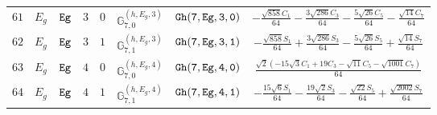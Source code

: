 \documentclass[fleqn,8pt]{jsarticle}
\begin{document}
\begin{table}[ht!]
\begin{center}
\begin{tabular}{cccccccc}
$ 61 $ & $ E_{g} $ & $ {\tt Eg} $ & $ 3 $ & $ 0 $ & $ \mathbb{G}_{7,0}^{(h,E_{g},3)} $ & $ {\tt Gh(7,Eg,3,0)} $ & $ - \frac{\sqrt{858} C_{1}}{64} - \frac{3 \sqrt{286} C_{3}}{64} - \frac{5 \sqrt{26} C_{5}}{64} - \frac{\sqrt{14} C_{7}}{64} $ \\
$ 62 $ & $ E_{g} $ & $ {\tt Eg} $ & $ 3 $ & $ 1 $ & $ \mathbb{G}_{7,1}^{(h,E_{g},3)} $ & $ {\tt Gh(7,Eg,3,1)} $ & $ - \frac{\sqrt{858} S_{1}}{64} + \frac{3 \sqrt{286} S_{3}}{64} - \frac{5 \sqrt{26} S_{5}}{64} + \frac{\sqrt{14} S_{7}}{64} $ \\
$ 63 $ & $ E_{g} $ & $ {\tt Eg} $ & $ 4 $ & $ 0 $ & $ \mathbb{G}_{7,0}^{(h,E_{g},4)} $ & $ {\tt Gh(7,Eg,4,0)} $ & $ \frac{\sqrt{2} \left(- 15 \sqrt{3} C_{1} + 19 C_{3} - \sqrt{11} C_{5} - \sqrt{1001} C_{7}\right)}{64} $ \\
$ 64 $ & $ E_{g} $ & $ {\tt Eg} $ & $ 4 $ & $ 1 $ & $ \mathbb{G}_{7,1}^{(h,E_{g},4)} $ & $ {\tt Gh(7,Eg,4,1)} $ & $ - \frac{15 \sqrt{6} S_{1}}{64} - \frac{19 \sqrt{2} S_{3}}{64} - \frac{\sqrt{22} S_{5}}{64} + \frac{\sqrt{2002} S_{7}}{64} $ \\
 \hline \hline
\end{tabular}
\end{center}
\end{table}
\end{document}
